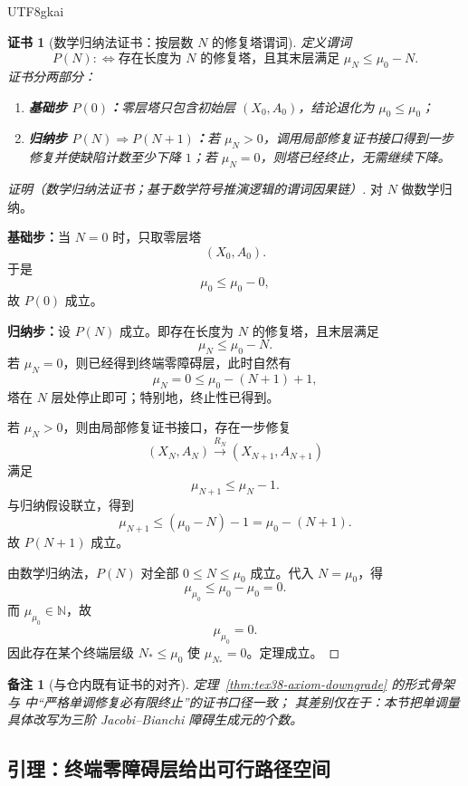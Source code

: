\documentclass[12pt]{article}
\newtheorem{remark}{备注}[section]
\newtheorem{Certificate}{证书}[section]
\newcommand{\NN}{\mathbb{N}}
\begin{document}
\begin{CJK*}{UTF8}{gkai}
\begin{Certificate}[数学归纳法证书：按层数 $N$ 的修复塔谓词]
\label{cert:tex38-axiom-downgrade}
定义谓词
\[
  P(N)
  :
  \Longleftrightarrow
  \text{存在长度为 $N$ 的修复塔，且其末层满足 }\mu_N\le \mu_0-N.
\]
证书分两部分：
\begin{enumerate}
  \item \textbf{基础步 $P(0)$：}零层塔只包含初始层 $(X_0,A_0)$，结论退化为 $\mu_0\le\mu_0$；
  \item \textbf{归纳步 $P(N)\Rightarrow P(N+1)$：}若 $\mu_N>0$，调用局部修复证书接口得到一步修复并使缺陷计数至少下降 $1$；若 $\mu_N=0$，则塔已经终止，无需继续下降。
\end{enumerate}
\end{Certificate}

\begin{proof}[证明（数学归纳法证书；基于数学符号推演逻辑的谓词因果链）]
对 $N$ 做数学归纳。

\textbf{基础步：}当 $N=0$ 时，只取零层塔
\[
  (X_0,A_0).
\]
于是
\[
  \mu_0\le \mu_0-0,
\]
故 $P(0)$ 成立。

\textbf{归纳步：}设 $P(N)$ 成立。即存在长度为 $N$ 的修复塔，且末层满足
\[
  \mu_N\le \mu_0-N.
\]
若 $\mu_N=0$，则已经得到终端零障碍层，此时自然有
\[
  \mu_N=0\le \mu_0-(N+1)+1,
\]
塔在 $N$ 层处停止即可；特别地，终止性已得到。

若 $\mu_N>0$，则由局部修复证书接口，存在一步修复
\[
  (X_N,A_N)\xrightarrow{R_N}(X_{N+1},A_{N+1})
\]
满足
\[
  \mu_{N+1}\le \mu_N-1.
\]
与归纳假设联立，得到
\[
  \mu_{N+1}
  \le
  (\mu_0-N)-1
  =
  \mu_0-(N+1).
\]
故 $P(N+1)$ 成立。

由数学归纳法，$P(N)$ 对全部 $0\le N\le \mu_0$ 成立。代入 $N=\mu_0$，得
\[
  \mu_{\mu_0}\le \mu_0-\mu_0=0.
\]
而 $\mu_{\mu_0}\in\NN$，故
\[
  \mu_{\mu_0}=0.
\]
因此存在某个终端层级 $N_\ast\le \mu_0$ 使 $\mu_{N_\ast}=0$。定理成立。
\end{proof}

\begin{remark}[与仓内既有证书的对齐]
定理~\ref{thm:tex38-axiom-downgrade} 的形式骨架与 \cite{RepoTex31RepairTower} 中“严格单调修复必有限终止”的证书口径一致；
其差别仅在于：本节把单调量具体改写为三阶 Jacobi--Bianchi 障碍生成元的个数。
\end{remark}

\subsection{引理：终端零障碍层给出可行路径空间}
\label{sec:tex38-path}


\end{CJK*}
\end{document}
